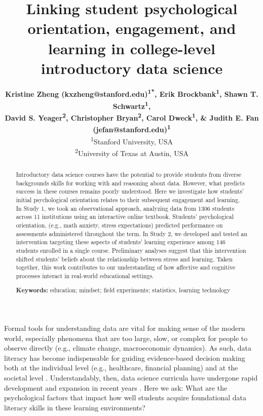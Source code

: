 \documentclass[10pt,letterpaper]{article}
\title{Linking student psychological orientation, engagement, and learning in college-level introductory data science}
\author{
    {\large{\textbf{Kristine Zheng (kxzheng@stanford.edu)\textsuperscript{1*}, Erik Brockbank\textsuperscript{1}, Shawn T. Schwartz\textsuperscript{1},}}} \\ 
    {\large{\textbf{David S. Yeager\textsuperscript{2}, Christopher Bryan\textsuperscript{2}, Carol Dweck\textsuperscript{1}, \& Judith E. Fan (jefan@stanford.edu)\textsuperscript{1}}}} \\
    \textsuperscript{1}Stanford University, USA \\ 
    \textsuperscript{2}University of Texas at Austin, USA 
}
\begin{document}
\maketitle


\begin{abstract}
Introductory data science courses have the potential to provide students from diverse backgrounds skills for working with and reasoning about data.
However, what predicts success in these courses remains poorly understood.
Here we investigate how students' initial psychological orientation relates to their subsequent engagement and learning.
In Study 1, we took an observational approach, analyzing data from 1306 students across 11 institutions using an interactive online textbook.
Students' psychological orientation, (e.g., math anxiety, stress expectations) predicted performance on assessments administered throughout the term.
In Study 2, we developed and tested an intervention targeting these aspects of students' learning experience among 146 students enrolled in a single course.
Preliminary analyses suggest that this intervention shifted students' beliefs about the relationship between stress and learning.
Taken together, this work contributes to our understanding of how affective and cognitive processes interact in real-world educational settings.

\textbf{Keywords:} 
education; mindset; field experiments; statistics, learning technology

\end{abstract}



Formal tools for understanding data are vital for making sense of the modern world, especially phenomena that are too large, slow, or complex for people to observe directly (e.g., climate change, macroeconomic dynamics).
As such, data literacy has become indispensable for guiding evidence-based decision making both at the individual level (e.g., healthcare, financial planning) and at the societal level \cite{gal2002adults,provost2013data,muhammad2020predictive}. 
Understandably, then, data science curricula have undergone rapid development and expansion in recent years \cite{de2017curriculum, manyika2011big}.
Here we ask: What are the psychological factors that impact how well students acquire foundational data literacy skills in these learning environments?
\end{document}
